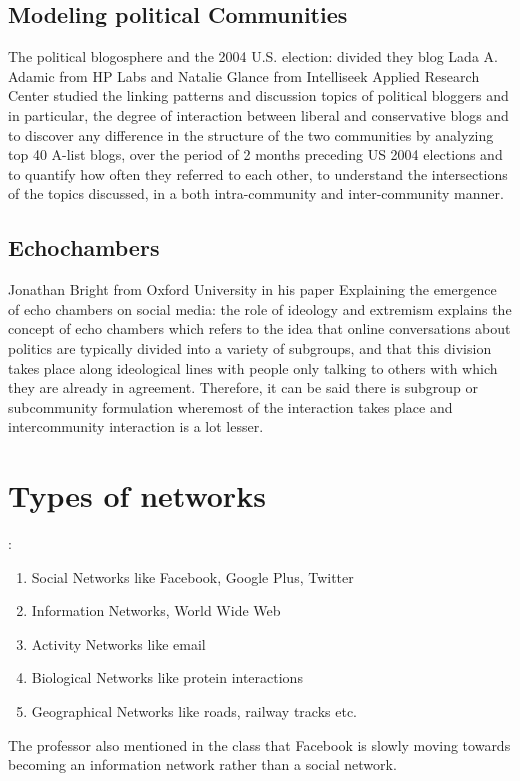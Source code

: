 \subsection{Modeling political Communities}
The political blogosphere and the 2004 U.S. election: divided they blog
Lada A. Adamic from HP Labs and Natalie Glance from Intelliseek Applied Research Center studied the linking patterns and discussion topics of political bloggers and in particular, the degree of interaction between liberal and conservative blogs and to discover any difference in the structure of the two communities by analyzing top 40 A-list blogs, over the period of 2 months preceding US 2004 elections and to quantify how often they referred to each other, to understand the intersections of the topics discussed, in a both intra-community and inter-community manner.

\subsection{Echochambers}
Jonathan Bright from Oxford University in his paper Explaining the emergence of echo chambers on social media: the role of ideology and extremism explains the concept of echo chambers which refers to the idea that online conversations about politics are typically divided into a variety of subgroups, and that this division takes place along ideological lines with people only talking to others with which they are already in agreement. Therefore, it can be said there is subgroup or subcommunity formulation wheremost of the interaction takes place and intercommunity interaction is a lot lesser.

\section{Types of networks}:
\begin{enumerate}
\item Social Networks like Facebook, Google Plus, Twitter
\item Information Networks, World Wide Web
\item Activity Networks like email
\item Biological Networks like protein interactions
\item Geographical Networks like roads, railway tracks etc.
\end{enumerate}


The professor also mentioned in the class that Facebook is slowly moving towards becoming an information network rather than a social network.
